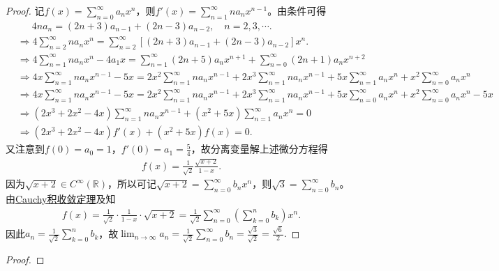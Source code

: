 \documentclass[../../main.tex]{subfiles}
\begin{document}
\begin{proof}
记$f(x) = \sum_{n=0}^{\infty} a_n x^n$，则$f'(x) = \sum_{n=1}^{\infty} n a_n x^{n-1}$。由条件可得
\begin{align*}
&\quad \,\,\, 4n a_n = (2n+3)a_{n-1} + (2n-3)a_{n-2}, \quad n=2,3,\cdots .
\\
&\Rightarrow 4\sum_{n=2}^{\infty} n a_n x^n = \sum_{n=2}^{\infty} \left[ (2n+3)a_{n-1} + (2n-3)a_{n-2} \right] x^n.
\\
&\Rightarrow 4\sum_{n=1}^{\infty} n a_n x^n - 4a_1 x = \sum_{n=1}^{\infty} (2n+5)a_n x^{n+1} + \sum_{n=0}^{\infty} (2n+1)a_n x^{n+2}
\\
&\Rightarrow 4x\sum_{n=1}^{\infty} n a_n x^{n-1} - 5x = 2x^2\sum_{n=1}^{\infty} n a_n x^{n-1} + 2x^3\sum_{n=1}^{\infty} n a_n x^{n-1} + 5x\sum_{n=1}^{\infty} a_n x^n + x^2\sum_{n=0}^{\infty} a_n x^n
\\
&\Rightarrow 4x\sum_{n=1}^{\infty} n a_n x^{n-1} - 5x = 2x^2\sum_{n=1}^{\infty} n a_n x^{n-1} + 2x^3\sum_{n=1}^{\infty} n a_n x^{n-1} + 5x\sum_{n=0}^{\infty} a_n x^n + x^2\sum_{n=0}^{\infty} a_n x^n - 5x
\\
&\Rightarrow (2x^3 + 2x^2 - 4x) \sum_{n=1}^{\infty} n a_n x^{n-1} + (x^2 + 5x) \sum_{n=1}^{\infty} a_n x^n = 0
\\
&\Rightarrow (2x^3 + 2x^2 - 4x) f'(x) + (x^2 + 5x) f(x) = 0.
\end{align*}
又注意到$f(0) = a_0 = 1$，$f'(0) = a_1 = \frac{5}{4}$，故分离变量解上述微分方程得
\begin{align*}
f(x) = \frac{1}{\sqrt{2}} \frac{\sqrt{x+2}}{1-x}.
\end{align*}
因为$\sqrt{x+2} \in C^{\infty}(\mathbb{R})$，所以可记$\sqrt{x+2} = \sum_{n=0}^{\infty} b_n x^n$，则$\sqrt{3} = \sum_{n=0}^{\infty} b_n$。由\hyperref[theorem:Cauchy积收敛定理]{Cauchy积收敛定理}及知
\begin{align*}
f(x) = \frac{1}{\sqrt{2}} \cdot \frac{1}{1-x} \cdot \sqrt{x+2} = \frac{1}{\sqrt{2}} \sum_{n=0}^{\infty} \left( \sum_{k=0}^n b_k \right) x^n.
\end{align*}
因此$a_n = \frac{1}{\sqrt{2}} \sum_{k=0}^n b_k$，故$\lim_{n\rightarrow \infty} a_n = \frac{1}{\sqrt{2}} \sum_{n=0}^{\infty} b_n = \frac{\sqrt{3}}{\sqrt{2}} = \frac{\sqrt{6}}{2}.$
\end{proof}

\begin{example}

\end{example}
\begin{proof}

\end{proof}
\end{document}
